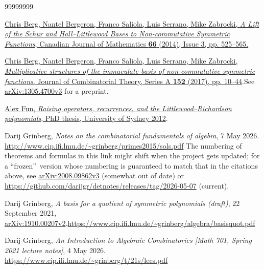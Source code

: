 \documentclass
[numbers=enddot,12pt,final,onecolumn,notitlepage,english]{scrartcl}%
\theoremstyle{definition}
\begin{document}
\begin{thebibliography}{99999999}                                                                                         %


\href{https://doi.org/10.4153/CJM-2013-013-0}{Chris
Berg, Nantel Bergeron, Franco Saliola, Luis Serrano, Mike Zabrocki, \textit{A
Lift of the Schur and Hall--Littlewood Bases to Non-commutative Symmetric
Functions}, Canadian Journal of Mathematics \textbf{66} (2014), Issue 3, pp.
525--565.}

%
\href{https://doi.org/10.1016/j.jcta.2017.05.003}{Chris Berg, Nantel
Bergeron, Franco Saliola, Luis Serrano, Mike Zabrocki, \textit{Multiplicative
structures of the immaculate basis of non-commutative symmetric functions},
Journal of Combinatorial Theory, Series A \textbf{152} (2017), pp.
10--44}.\newline See
\href{https://arxiv.org/abs/1305.4700v3}{arXiv:1305.4700v3} for a preprint.

\href{http://hdl.handle.net/2123/8958}{Alex Fun,
\textit{Raising operators, recurrences, and the Littlewood--Richardson
polynomials}, PhD thesis, University of Sydney 2012}.

Darij Grinberg, \textit{Notes on the combinatorial
fundamentals of algebra}, 7 May 2026.\newline%
\url{http://www.cip.ifi.lmu.de/~grinberg/primes2015/sols.pdf} \newline The
numbering of theorems and formulas in this link might shift when the project
gets updated; for a \textquotedblleft frozen\textquotedblright\ version whose
numbering is guaranteed to match that in the citations above, see
\href{http://arxiv.org/abs/2008.09862v3}{arXiv:2008.09862v3} (somewhat
out of date) or
\url{https://github.com/darijgr/detnotes/releases/tag/2026-05-07} (current).

Darij Grinberg, \textit{A basis for a quotient of
symmetric polynomials (draft)}, 22 September 2021,
\href{https://arxiv.org/abs/1910.00207v2}{arXiv:1910.00207v2}.\newline\url{https://www.cip.ifi.lmu.de/~grinberg/algebra/basisquot.pdf}

Darij Grinberg, \textit{An Introduction to Algebraic
Combinatorics [Math 701, Spring 2021 lecture notes]}, 4 May 2026.\newline
\url{https://www.cip.ifi.lmu.de/~grinberg/t/21s/lecs.pdf}


\end{thebibliography}
\end{document}

